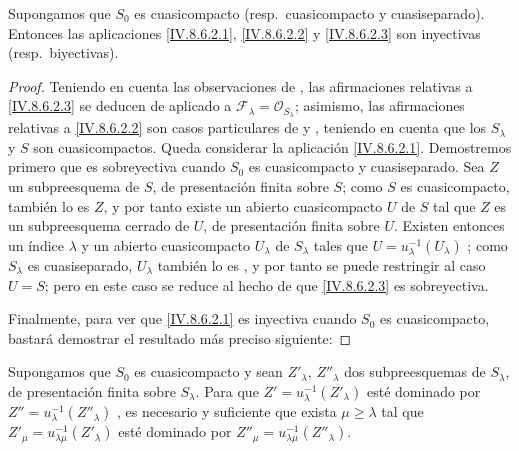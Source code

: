 \begin{proposition}[8.6.3]
\label{IV.8.6.3-fr}
Supongamos que $S_0$ es cuasicompacto \textup{(resp.}\ cuasicompacto y cuasiseparado\textup{)}.
Entonces las aplicaciones \eqref{IV.8.6.2.1}, \eqref{IV.8.6.2.2} y \eqref{IV.8.6.2.3} son inyectivas \textup{(resp.}\ biyectivas\textup{)}.
\end{proposition}

\begin{proof}
Teniendo en cuenta las observaciones de , las afirmaciones relativas a \eqref{IV.8.6.2.3} se deducen de  aplicado a $\mathcal F_\lambda=\mathcal O_{S_\lambda}$; asimismo, las afirmaciones relativas a \eqref{IV.8.6.2.2} son casos particulares de  y , teniendo en cuenta que los $S_\lambda$ y $S$ son cuasicompactos.
Queda considerar la aplicación \eqref{IV.8.6.2.1}.
Demostremos primero que es sobreyectiva cuando $S_0$ es cuasicompacto y cuasiseparado.
Sea $Z$ un subpreesquema de $S$, de presentación finita sobre $S$; como $S$ es cuasicompacto, también lo es $Z$, y por tanto existe un abierto cuasicompacto $U$ de $S$ tal que $Z$ es un subpreesquema cerrado de $U$, de presentación finita sobre $U$.
Existen entonces un índice $\lambda$ y un abierto cuasicompacto $U_\lambda$ de $S_\lambda$ tales que $U=u_\lambda^{-1}(U_\lambda)$ ; como $S_\lambda$ es cuasiseparado, $U_\lambda$ también lo es , y por tanto se puede restringir al caso $U=S$; pero en este caso se reduce al hecho de que \eqref{IV.8.6.2.3} es sobreyectiva.

Finalmente, para ver que \eqref{IV.8.6.2.1} es inyectiva cuando $S_0$ es cuasicompacto, bastará demostrar el resultado más preciso siguiente:
\end{proof}

\begin{corollary}[8.6.3.1]
\label{IV.8.6.3.1-fr}
Supongamos que $S_0$ es cuasicompacto y sean $Z'_\lambda$, $Z''_\lambda$ dos subpreesquemas de $S_\lambda$, de presentación finita sobre $S_\lambda$.
Para que $Z'=u_\lambda^{-1}(Z'_\lambda)$ esté dominado por $Z''=u_\lambda^{-1}(Z''_\lambda)$ , es necesario y suficiente que exista $\mu\geq\lambda$ tal que $Z'_\mu=u_{\lambda\mu}^{-1}(Z'_\lambda)$ esté dominado por $Z''_\mu=u_{\lambda\mu}^{-1}(Z''_\lambda)$.
\end{corollary}

